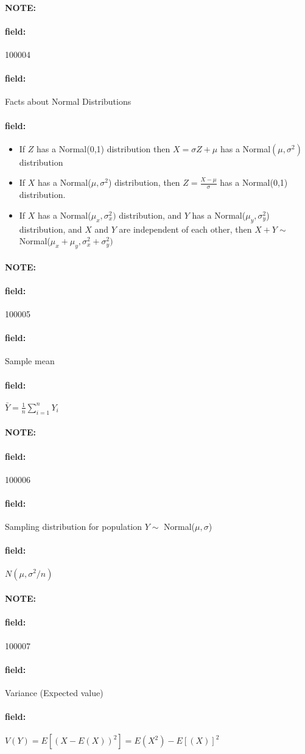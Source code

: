 \documentclass[12pt]{article}
\newenvironment{note}{\paragraph{NOTE:}}{}
\newenvironment{field}{\paragraph{field:}}{}
\begin{document}
\begin{note} \begin{field} \tiny 100004 \end{field}
 \begin{field}
  Facts about Normal Distributions
 \end{field}
 \begin{field}
  \begin{itemize}
   \item If $Z$ has a Normal(0,1) distribution then $X = \sigma Z + \mu$ has a Normal$(\mu,\sigma^2)$ distribution
   \item If $X$ has a Normal($\mu,\sigma^2$) distribution, then $Z = \frac{X - \mu}{\sigma}$ has a Normal(0,1) distribution.
   \item If $X$ has a Normal($\mu_x,\sigma^2_x)$ distribution, and $Y$ has a Normal($\mu_y,\sigma_y^2$) distribution, and $X$ and $Y$ are independent of each other, then $X + Y \sim $ Normal($\mu_x + \mu_y, \sigma_x^2 + \sigma_y^2)$
  \end{itemize}
 \end{field}
\end{note}

\begin{note} \begin{field} \tiny 100005 \end{field}
 \begin{field}
  Sample mean
 \end{field}
 \begin{field}
  $\bar{Y} = \frac{1}{n}\sum_{i=1}^n Y_i$
 \end{field}
\end{note}

\begin{note} \begin{field} \tiny 100006 \end{field}
 \begin{field}
  Sampling distribution for population $Y \sim $ Normal($\mu,\sigma$)
 \end{field}
 \begin{field}
  $N(\mu,\sigma^2/n)$
 \end{field}
\end{note}

\begin{note} \begin{field} \tiny 100007 \end{field}
 \begin{field}
  Variance (Expected value)
 \end{field}
 \begin{field}
  $V(Y) = E[(X - E(X))^2] = E(X^2) - E[(X)]^2$
 \end{field}
\end{note}
\end{document}
